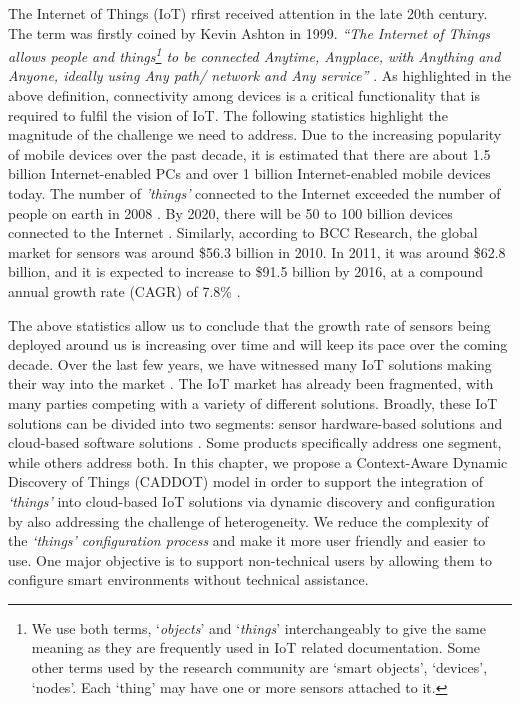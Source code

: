 \documentclass[graybox]{svmult}
\newcommand{\things}{\textit{'things' }}
\begin{document}
The Internet of Things (IoT) \cite{P003} rfirst received attention in the late 20th century. The term was firstly coined by Kevin Ashton \cite{P065} in 1999.  \textit{``The Internet of Things allows people and things\footnote{We use both terms, `\textit{objects}' and `\textit{things}' interchangeably to give the same meaning as they are frequently used in IoT related documentation. Some other terms used by the research community are `smart objects', `devices', `nodes'. Each `thing' may have one or more sensors attached to it.} to be connected Anytime, Anyplace, with Anything and Anyone, ideally using Any path/ network and Any service''} \cite{P019}. As highlighted in the above definition, connectivity among devices is a critical functionality that is required to fulfil the vision of IoT. The following statistics highlight the magnitude of the challenge we need to address. Due to the increasing popularity of mobile devices over the past decade, it is estimated that there are about 1.5 billion Internet-enabled PCs and over 1 billion Internet-enabled mobile devices today. The number of \things connected to the Internet exceeded the number of people on earth in 2008 \cite{P574}. By 2020, there will be 50 to 100 billion devices connected to the Internet \cite{P029}. Similarly, according to BCC Research, the global market for sensors was around \$56.3 billion in 2010. In 2011, it was around \$62.8 billion, and it is expected to increase to \$91.5 billion by 2016, at a compound annual growth rate  (CAGR) of 7.8\%  \cite{P255}.

The above statistics allow us to conclude that the growth rate of sensors being deployed around us is increasing over time and will keep its pace over the coming decade. Over the last few years, we have witnessed many IoT solutions making their way into the market  \cite{P596}. The IoT market has already been fragmented, with many parties competing with a variety of different solutions. Broadly, these IoT solutions can be divided into two segments: sensor hardware-based solutions  \cite{P595} and cloud-based software solutions \cite{P579, P227, P377}. Some products specifically address one segment, while others address both. In this chapter, we propose a Context-Aware Dynamic Discovery of Things (CADDOT) model in order to support the integration of  \textit{`things'} into cloud-based IoT solutions via dynamic discovery and configuration by also addressing the challenge of heterogeneity. We reduce the complexity of the \textit{`things' configuration process} and make it more user friendly and easier to use. One major objective is to support non-technical users by allowing them to configure smart environments without technical assistance.
\end{document}
